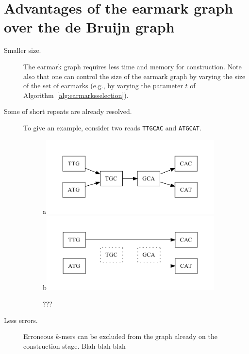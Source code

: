 \documentclass[12pt]{article}
\begin{document}
\section{Advantages of the earmark graph over the de Bruijn 
graph}\label{sec:advantages}

\begin{description}
\item[Smaller size.]
The earmark graph requires less time and memory for construction.
Note also that one can control the size of the earmark graph 
by varying the size of the set of earmarks (e.g., by varying the parameter $t$
of Algorithm~\ref{alg:earmarksselection}).
\item[Some of short repeats are already resolved.]
To give an example, consider two reads {\tt TTGCAC} and {\tt ATGCAT}.

\begin{figure}
\caption{???}\label{fig:repeatexample}
\begin{center}
a\includegraphics[width=0.9\textwidth]{fig6_de.pdf}\\
b\includegraphics[width=0.9\textwidth]{fig6_ear.pdf}\\
\end{center}
\end{figure}

\item[Less errors.] Erroneous $k$-mers can be excluded from the graph already on
the construction stage.
Blah-blah-blah
\end{description}
\end{document}
